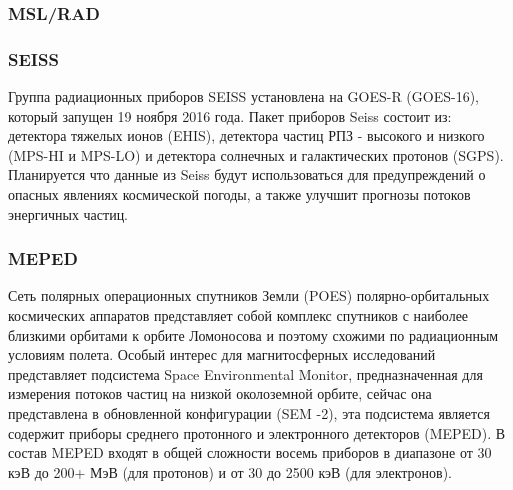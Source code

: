 \subsubsection{MSL/RAD}





\subsubsection{SEISS}
Группа радиационных приборов SEISS установлена на GOES-R (GOES-16)\cite{Goodman2013}, который запущен 19 ноября 2016 года. 
Пакет приборов Seiss состоит из: детектора тяжелых ионов  (EHIS), детектора частиц РПЗ - высокого и низкого (MPS-HI и MPS-LO) и детектора солнечных и галактических протонов (SGPS). Планируется что данные из Seiss будут использоваться для предупреждений о опасных явлениях космической погоды, а также улучшит прогнозы потоков энергичных частиц. 

\subsubsection{MEPED}
Сеть полярных операционных спутников Земли (POES) полярно-орбитальных космических аппаратов представляет собой комплекс спутников с наиболее близкими орбитами к орбите Ломоносова и поэтому схожими по радиационным условиям полета. Особый интерес для магнитосферных исследований представляет подсистема Space Environmental Monitor, предназначенная для измерения потоков частиц на низкой околоземной орбите, сейчас она представлена ​​в обновленной конфигурации (SEM -2), эта подсистема является содержит приборы среднего протонного и электронного детекторов (MEPED).
В состав MEPED входят в общей сложности восемь приборов в диапазоне от 30 кэВ до 200+ МэВ (для протонов) и от 30 до 2500 кэВ (для электронов).

